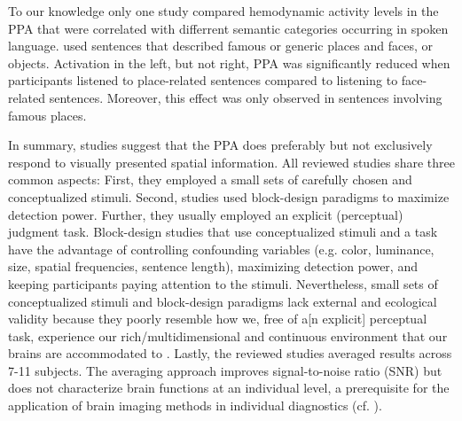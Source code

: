 \documentclass[english]{article}
\begin{document}
To our knowledge only one study \citep{aziz2008modulation} compared hemodynamic
activity levels in the PPA that were correlated with differrent semantic
categories occurring in spoken language.
\cite{aziz2008modulation} used sentences that described famous or generic places
and faces, or objects.
Activation in the left, but not right, PPA was significantly reduced when
participants listened to place-related sentences compared to listening to
face-related sentences. Moreover, this effect was only observed in sentences
involving famous places.

In summary, studies suggest that the PPA does preferably but not exclusively
respond to visually presented spatial information.
All reviewed studies share three common aspects:
First, they employed a small sets of carefully chosen and conceptualized
stimuli.
Second, studies used block-design paradigms to maximize detection power.
Further, they usually employed an explicit (perceptual) judgment task.
Block-design studies that use conceptualized stimuli and a task have the
advantage of controlling confounding variables (e.g. color, luminance, size,
spatial frequencies, sentence length), maximizing detection power, and keeping
participants paying attention to the stimuli.
Nevertheless, small sets of conceptualized stimuli and block-design paradigms
lack external and ecological validity \citep{westfall2016fixing,
hasson2004intersubject} because they poorly resemble how we, free of a[n
explicit] perceptual task, experience our rich/multidimensional and continuous
environment that our brains are accommodated to
\citep{sonkusare2019naturalistic}.
Lastly, the reviewed studies averaged results across 7-11 subjects.
The averaging approach improves signal-to-noise ratio (SNR) but does not
characterize brain functions at an individual level, a prerequisite for the
application of brain imaging methods in individual diagnostics (cf.
\cite{dubois2016building, eickhoff2020towards}).
\end{document}
